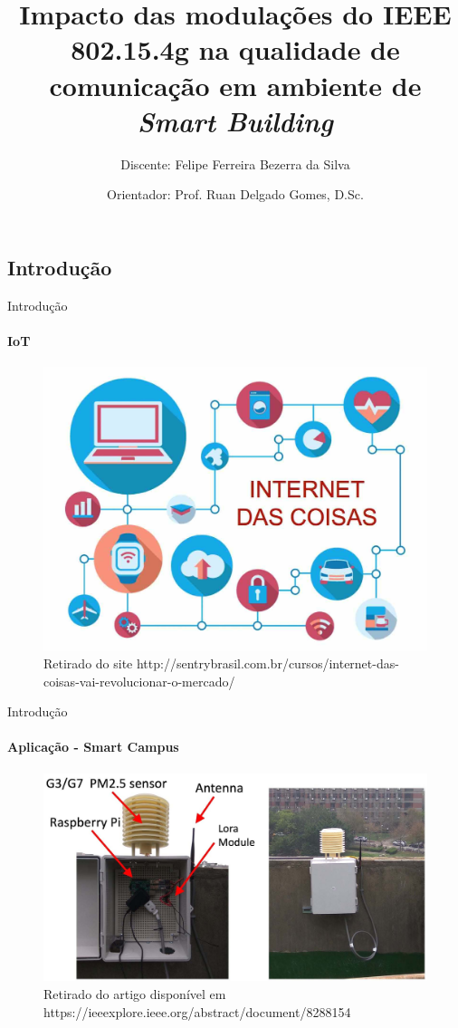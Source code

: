 \documentclass[t]{beamer}
\title{Impacto das modulações do {IEEE 802.15.4g} na qualidade de comunicação em ambiente de \textit{Smart Building}}
\subtitle{Discente: Felipe Ferreira Bezerra da Silva}
\author{Orientador: Prof. Ruan Delgado Gomes, D.Sc.}
\begin{document}
\frame[c]{\maketitle}


\begin{darkframes}

  \section{Introdução}
  \begin{frame}{Introdução}
    \framesubtitle{IoT}
    \begin{figure}[ht]
      \centering
      \includegraphics[width=.7\textwidth]{resources/intro_iot.jpg}\\
      \footnotesize{Retirado do site http://sentrybrasil.com.br/cursos/internet-das-coisas-vai-revolucionar-o-mercado/}
    \end{figure}
  \end{frame}

  \begin{frame}{Introdução}
    \framesubtitle{Aplicação - Smart Campus}
    \begin{figure}[ht]
      \centering
      \includegraphics[width=.9\textwidth]{resources/smart-campus-example.png}\\
      \footnotesize{Retirado do artigo disponível em https://ieeexplore.ieee.org/abstract/document/8288154}
    \end{figure}
  \end{frame}


\end{darkframes}
\end{document}
